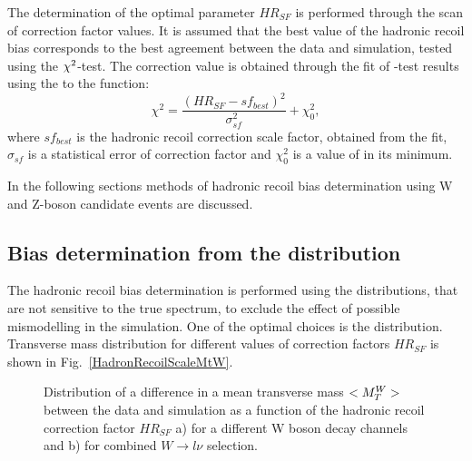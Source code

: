 The determination of the optimal parameter $HR_{SF}$ is performed through the scan of correction factor values. It is assumed that the best value of the hadronic recoil bias corresponds to the best agreement between the data and simulation, tested using the $\chi^2$-test. The correction value is obtained through the \chiD fit of \chiD-test results using the to the function:
\begin{equation}\label{eq:chiD}
\chi^2 = \frac{(HR_{SF}-sf_{best})^2}{\sigma_{sf}^2}+\chi^2_0,
\end{equation}
where $sf_{best}$ is the hadronic recoil correction scale factor, obtained from the \chiD fit,  $\sigma_{sf}$ is a statistical error of correction factor and $\chi^2_0$ is a value of \chiD in its minimum. 

In the following sections methods of hadronic recoil bias determination using W and Z-boson candidate events are discussed.

\subsection{Bias determination from the \mtw distribution}


The hadronic recoil bias determination is performed using the distributions, that  are not sensitive to the true \ptw spectrum, to exclude the effect of possible \ptw mismodelling in the simulation.  One of the optimal choices is the \mtw distribution. Transverse mass distribution for different values of correction factors $HR_{SF}$ is shown in Fig.~\ref{HadronRecoilScaleMtW}. 

\begin{figure}[!tbp]
\begin{minipage}[h]{0.49\linewidth}
\end{minipage}
\hfill
\begin{minipage}[h]{0.49\linewidth}
\end{minipage}
\caption{Distribution of a difference in a mean transverse mass $<M_T^W>$ between the data and simulation as a function of the hadronic recoil correction factor $HR_{SF}$ a) for a different W boson decay channels and b) for combined $W \to l \nu$ selection.}
\label{fig:HRBiasMean}
\end{figure}

